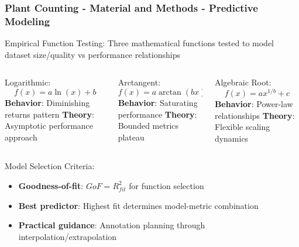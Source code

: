 \documentclass[aspectratio=43]{beamer}
\begin{document}
\begin{frame}
    \frametitle{Plant Counting - Material and Methods - Predictive Modeling}
    
    \begin{block}{Empirical Function Testing:}
        \small Three mathematical functions tested to model dataset size/quality vs performance relationships
    \end{block}
    
    \begin{columns}
        \begin{column}{0.33\textwidth}
            \begin{exampleblock}{Logarithmic:}
                \scriptsize
                $$f(x) = a \ln(x) + b$$
                \textbf{Behavior}: Diminishing returns pattern
                \textbf{Theory}: Asymptotic performance approach
            \end{exampleblock}
        \end{column}
        
        \begin{column}{0.33\textwidth}
            \begin{alertblock}{Arctangent:}
                \scriptsize
                $$f(x) = a \arctan(bx) + c$$
                \textbf{Behavior}: Saturating performance
                \textbf{Theory}: Bounded metrics plateau
            \end{alertblock}
        \end{column}
        
        \begin{column}{0.33\textwidth}
            \begin{block}{Algebraic Root:}
                \scriptsize
                $$f(x) = a x^{1/b} + c$$
                \textbf{Behavior}: Power-law relationships
                \textbf{Theory}: Flexible scaling dynamics
            \end{block}
        \end{column}
    \end{columns}
    
    \begin{exampleblock}{Model Selection Criteria:}
        \small
        \begin{itemize}
            \item \textbf{Goodness-of-fit}: $GoF = R^2_{fit}$ for function selection
            \item \textbf{Best predictor}: Highest fit determines model-metric combination
            \item \textbf{Practical guidance}: Annotation planning through interpolation/extrapolation
        \end{itemize}
    \end{exampleblock}
\end{frame}
\end{document}
